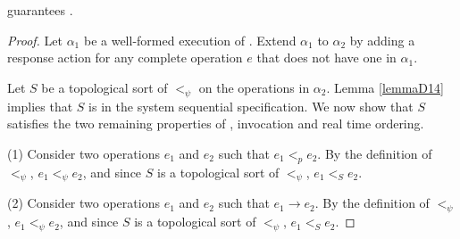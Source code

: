 \begin{thm}
    \sys{} guarantees \mdllong{}.
\end{thm}

\begin{proof}
    Let $\alpha_1$ be a well-formed execution of \sys{}. Extend $\alpha_1$ to $\alpha_2$ by adding a response action for any complete operation $e$ that does not have one in $\alpha_1$.

    Let $S$ be a topological sort of $<_\psi$ on the operations in $\alpha_2$. Lemma \ref{lemmaD14} implies that $S$ is in the system sequential specification. We now show that $S$ satisfies the two remaining properties of \mdllong{}, invocation and real time ordering.

    (1) Consider two operations $e_1$ and $e_2$ such that $e_1 <_p e_2$. By the definition of $<_\psi$, $e_1 <_\psi e_2$, and since $S$ is a topological sort of $<_\psi$, $e_1 <_S e_2$.
    
    (2) Consider two operations $e_1$ and $e_2$ such that $e_1 \rightarrow e_2$. By the definition of $<_\psi$, $e_1 <_\psi e_2$, and since $S$ is a topological sort of $<_\psi$, $e_1 <_S e_2$.
\end{proof}